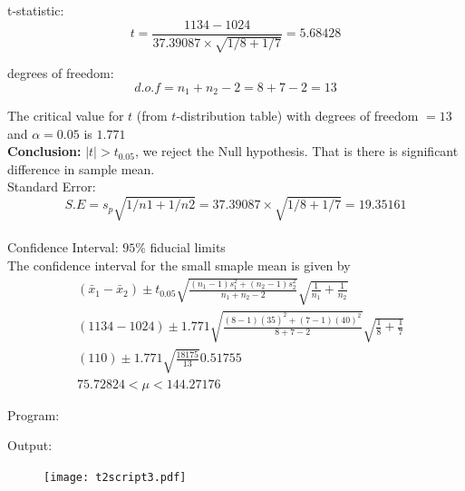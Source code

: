 \documentclass[a4paper,11pt,openright]{report}
\begin{document}
\begin{enumerate}
t-statistic:
\begin{equation*}
t = \frac{1134 - 1024}{37.39087 \times \sqrt{1/8 + 1/7}} = 5.68428
\end{equation*}

degrees of freedom:
\begin{equation*}
d.o.f = n_{1} + n_{2} - 2 = 8 + 7 - 2 = 13
\end{equation*}

The critical value for $t$ (from $t$-distribution table) with degrees of freedom $= 13$ and 
$\alpha = 0.05$ is $1.771$ \\

\textbf{Conclusion:} $|t| > t_{0.05}$, we reject the Null hypothesis. That is there is 
significant difference in sample mean. \\

Standard Error:
\begin{equation*}
S.E = s_{p} \sqrt{1/n1 + 1/n2} = 37.39087 \times \sqrt{1/8 + 1/7} = 19.35161
\end{equation*} \\

Confidence Interval: $95\%$ fiducial limits \\ 
The confidence interval for the small smaple mean is given by
\begin{equation*}
\begin{split}
&(\bar x_{1} - \bar x_{2}) \pm t_{0.05} \sqrt{\frac{(n_{1} - 1)s_{1}^{2} + (n_{2} - 1)s_{2}^{2}}{n_{1} + n_{2} -2}} \sqrt{\frac{1}{n_{1}} + \frac{1}{n_{2}}} \\
&(1134 - 1024) \pm 1.771 \sqrt{\frac{(8 - 1)(35)^{2} + (7 - 1)(40)^{2}}{8 + 7 - 2}} \sqrt{\frac{1}{8} + \frac{1}{7}} \\
&(110) \pm 1.771 \sqrt{\frac{18175}{13}} 0.51755 \\
&75.72824 < \mu < 144.27176
\end{split}
\end{equation*}

\vspace{1.5cm}

Program:


\vspace{1.5cm}

Output:


\begin{figure}[ht!]
\texttt{[image: t2script3.pdf]}
\centering
\end{figure}


%
%
%
%
%
%

\end{enumerate}
\end{document}
